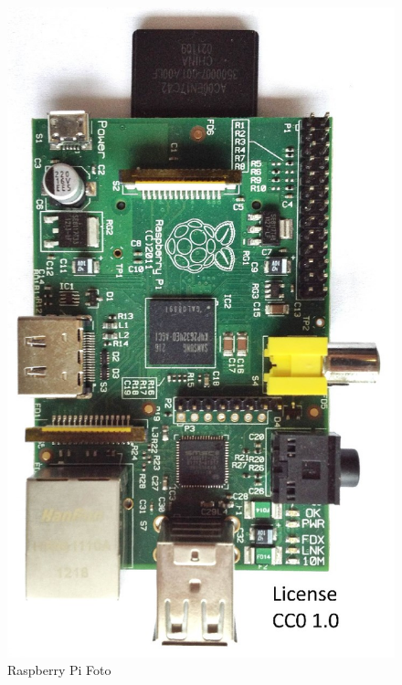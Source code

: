 \begin{figure}[ht]
  \centering
  \includegraphics[scale=0.12]{images/Raspberry_Pi.jpg}
  \caption{Raspberry Pi Foto}
  \label{fig:Raspberry_Pi_Foto}
\end{figure}
